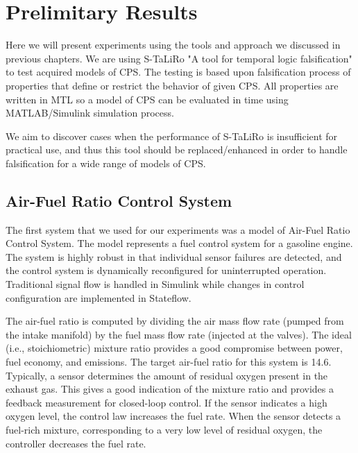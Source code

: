 \chapter{Prelimitary Results}
\label{chap.mainresults}

Here we will present experiments using the tools and approach we discussed in previous chapters. We are using S-TaLiRo "A tool for temporal logic falsification" to test acquired models of CPS. The testing is based upon falsification process of properties that define or restrict the behavior of given CPS. All properties are written in MTL so a model of CPS can be evaluated in time using MATLAB/Simulink simulation process.

We aim to discover cases when the performance of S-TaLiRo is insufficient for practical use, and thus this tool should be replaced/enhanced in order to handle falsification for a wide range of models of CPS. 

\section{Air-Fuel Ratio Control System}

The first system that we used for our experiments was a model of Air-Fuel Ratio Control System. The model represents a fuel control system for a gasoline engine. The system is highly robust in that individual sensor failures are detected, and the control system is dynamically reconfigured for uninterrupted operation. Traditional signal flow is handled in Simulink while changes in control configuration are implemented in Stateflow.

The air-fuel ratio is computed by dividing the air mass flow rate (pumped from the intake manifold) by the fuel mass flow rate (injected at the valves). The ideal (i.e., stoichiometric) mixture ratio provides a good compromise between power, fuel economy, and emissions. The target air-fuel ratio for this system is 14.6. Typically, a sensor determines the amount of residual oxygen present in the exhaust gas. This gives a good indication of the mixture ratio and provides a feedback measurement for closed-loop control. If the sensor indicates a high oxygen level, the control law increases the fuel rate. When the sensor detects a fuel-rich mixture, corresponding to a very low level of residual oxygen, the controller decreases the fuel rate.

